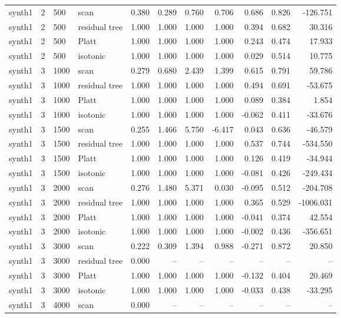 \begin{tabular}{lrllrrrrrrr}
synth1 & 2 & 500 & scan & 0.380 & 0.289 & 0.760 & 0.706 & 0.686 & 0.826 & -126.751 \\
synth1 & 2 & 500 & residual tree & 1.000 & 1.000 & 1.000 & 1.000 & 0.394 & 0.682 & 30.316 \\
synth1 & 2 & 500 & Platt & 1.000 & 1.000 & 1.000 & 1.000 & 0.243 & 0.474 & 17.933 \\
synth1 & 2 & 500 & isotonic & 1.000 & 1.000 & 1.000 & 1.000 & 0.029 & 0.514 & 10.775 \\
synth1 & 3 & 1000 & scan & 0.279 & 0.680 & 2.439 & 1.399 & 0.615 & 0.791 & 59.786 \\
synth1 & 3 & 1000 & residual tree & 1.000 & 1.000 & 1.000 & 1.000 & 0.494 & 0.691 & -53.675 \\
synth1 & 3 & 1000 & Platt & 1.000 & 1.000 & 1.000 & 1.000 & 0.089 & 0.384 & 1.854 \\
synth1 & 3 & 1000 & isotonic & 1.000 & 1.000 & 1.000 & 1.000 & -0.062 & 0.411 & -33.676 \\
synth1 & 3 & 1500 & scan & 0.255 & 1.466 & 5.750 & -6.417 & 0.043 & 0.636 & -46.579 \\
synth1 & 3 & 1500 & residual tree & 1.000 & 1.000 & 1.000 & 1.000 & 0.537 & 0.744 & -534.550 \\
synth1 & 3 & 1500 & Platt & 1.000 & 1.000 & 1.000 & 1.000 & 0.126 & 0.419 & -34.944 \\
synth1 & 3 & 1500 & isotonic & 1.000 & 1.000 & 1.000 & 1.000 & -0.081 & 0.426 & -249.434 \\
synth1 & 3 & 2000 & scan & 0.276 & 1.480 & 5.371 & 0.030 & -0.095 & 0.512 & -204.708 \\
synth1 & 3 & 2000 & residual tree & 1.000 & 1.000 & 1.000 & 1.000 & 0.365 & 0.529 & -1006.031 \\
synth1 & 3 & 2000 & Platt & 1.000 & 1.000 & 1.000 & 1.000 & -0.041 & 0.374 & 42.554 \\
synth1 & 3 & 2000 & isotonic & 1.000 & 1.000 & 1.000 & 1.000 & -0.002 & 0.436 & -356.651 \\
synth1 & 3 & 3000 & scan & 0.222 & 0.309 & 1.394 & 0.988 & -0.271 & 0.872 & 20.850 \\
synth1 & 3 & 3000 & residual tree & 0.000 & -- & -- & -- & -- & -- & -- \\
synth1 & 3 & 3000 & Platt & 1.000 & 1.000 & 1.000 & 1.000 & -0.132 & 0.404 & 20.469 \\
synth1 & 3 & 3000 & isotonic & 1.000 & 1.000 & 1.000 & 1.000 & -0.033 & 0.438 & -33.295 \\
synth1 & 3 & 4000 & scan & 0.000 & -- & -- & -- & -- & -- & -- \\

\end{tabular}
